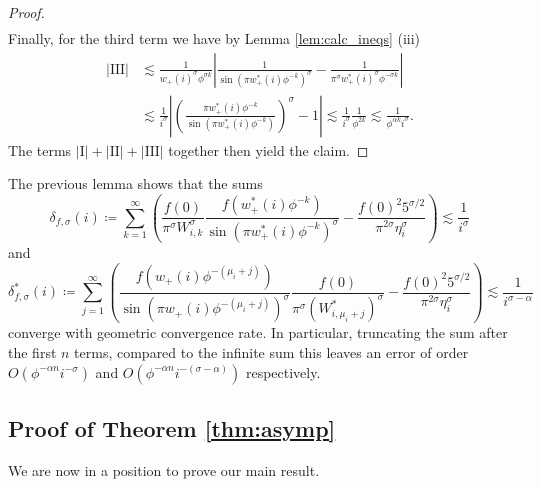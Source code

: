 \documentclass[]{interact}
\theoremstyle{definition}
\numberwithin{table}{section} %
\numberwithin{figure}{section}
\begin{document}
\begin{proof}
\begin{align*}
    \end{align*}
    Finally, for the third term we have by Lemma \ref{lem:calc_ineqs} (iii)
    \begin{align*}
        |\text{III}| & \lesssim \frac1{w_+(i)^\sigma \phi^{\sigma k}} \left|\frac1{\sin(\pi w_+^*(i)\phi^{-k})^\sigma} - \frac1{\pi^\sigma w_+^*(i)^\sigma \phi^{-\sigma k}}\right| \\
        & \lesssim \frac1{i^\sigma} \left|\left(\frac{\pi w_+^*(i)\phi^{-k}}{\sin(\pi w_+^*(i)\phi^{-k})}\right)^\sigma-1\right| \lesssim \frac1{i^\sigma} \frac1{\phi^{2k}} \lesssim \frac1{\phi^{\alpha k} i^\sigma}.
    \end{align*}
    The terms $|\text{I}|+|\text{II}|+|\text{III}|$ together then yield the claim.
\end{proof}

The previous lemma shows that the sums
$$
\delta_{f, \sigma}(i) \coloneqq \sum_{k=1}^\infty \left(\frac{f(0)}{\pi^\sigma W_{i, k}^\sigma} \frac{f(w_+^*(i) \phi^{-k})}{{\sin(\pi w_+^*(i) \phi^{-k})}^\sigma} - \frac{f(0)^2 5^{\sigma/2}}{\pi^{2\sigma} \eta_i^\sigma}\right) \lesssim \frac1{i^\sigma}
$$
and
$$
\delta_{f, \sigma}^*(i) \coloneqq \sum_{j=1}^\infty \left(\frac{f(w_+(i) \phi^{-(\mu_i+j)})}{{\sin(\pi w_+(i) \phi^{-(\mu_i+j)})}^\sigma} \frac{f(0)}{\pi^\sigma (W_{i, \mu_i+j}^*)^\sigma} - \frac{f(0)^2 5^{\sigma/2}}{\pi^{2\sigma} \eta_i^\sigma}\right) \lesssim \frac1{i^{\sigma-\alpha}}
$$
converge with geometric convergence rate. In particular, truncating the sum after the first $n$ terms, compared to the infinite sum this leaves an error of order $O(\phi^{-\alpha n} i^{-\sigma})$ and $O(\phi^{-\alpha n} i^{-(\sigma-\alpha)})$ respectively.

\subsection{Proof of Theorem \ref{thm:asymp}}

We are now in a position to prove our main result.
\end{document}
